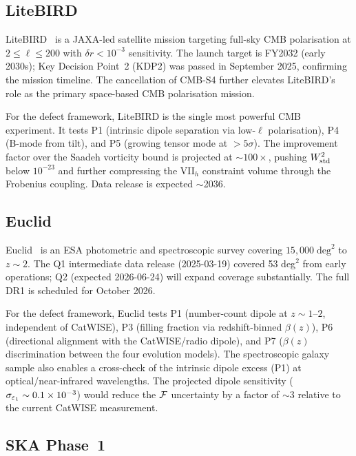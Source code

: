 \subsection{LiteBIRD}

LiteBIRD~\cite{LiteBIRD2023} is a JAXA-led
satellite mission targeting full-sky CMB polarisation at
$2 \leq \ell \leq 200$ with $\delta r < 10^{-3}$ sensitivity.
The launch target is FY2032 (early 2030s); Key Decision Point~2
(KDP2) was passed in September 2025, confirming the mission
timeline.  The cancellation of
CMB-S4 further elevates LiteBIRD's role as the primary
space-based CMB polarisation mission.

For the defect framework, LiteBIRD is the single most powerful
CMB experiment.  It tests P1 (intrinsic dipole separation via
low-$\ell$ polarisation), P4 (B-mode from tilt), and P5
(growing tensor mode at $> 5\sigma$).  The improvement factor
over the Saadeh vorticity bound is projected at $\sim 100\times$,
pushing $W^2_{\mathrm{std}}$ below $10^{-23}$ and further compressing the
VII$_h$ constraint volume through the Frobenius coupling.
Data release is expected $\sim$2036.


\subsection{Euclid}

Euclid~\cite{Euclid2024} is an ESA photometric and
spectroscopic survey covering $15{,}000\;\mathrm{deg}^2$ to
$z \sim 2$.  The Q1 intermediate data release
(2025-03-19) covered 53 deg$^2$ from early operations;
Q2 (expected 2026-06-24) will expand coverage substantially.
The full DR1 is scheduled for October 2026.

For the defect framework, Euclid tests P1 (number-count dipole
at $z \sim 1$--$2$, independent of CatWISE), P3 (filling
fraction via redshift-binned $\beta(z)$), P6 (directional
alignment with the CatWISE/radio dipole), and P7
($\beta(z)$ discrimination between the four evolution models).
The spectroscopic galaxy sample also enables a cross-check
of the intrinsic dipole excess (P1) at optical/near-infrared
wavelengths.
The projected dipole sensitivity ($\sigma_{\varepsilon_1} \sim
0.1 \times 10^{-3}$) would reduce the $\mathcal{F}$ uncertainty by a
factor of $\sim 3$ relative to the current CatWISE measurement.


\subsection{SKA Phase~1}

